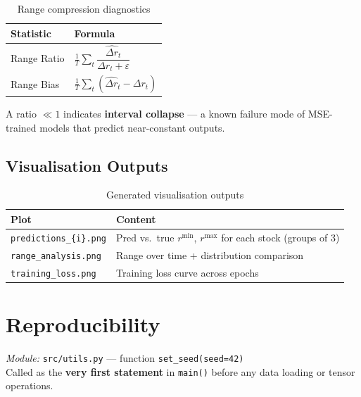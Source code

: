 \documentclass[12pt,a4paper]{article}
\newcommand{\codeinline}[1]{\texttt{\small #1}}
\begin{document}
\begin{table}[H]
\centering
\begin{tabular}{L{3cm} L{7cm}}
\toprule
\textbf{Statistic} & \textbf{Formula} \\
\midrule
Range Ratio & $\frac{1}{T}\sum_t \dfrac{\widehat{\Delta r}_t}{\Delta r_t + \varepsilon}$ \\[0.8em]
Range Bias  & $\frac{1}{T}\sum_t (\widehat{\Delta r}_t - \Delta r_t)$ \\
\bottomrule
\end{tabular}
\caption{Range compression diagnostics}
\end{table}

A ratio $\ll 1$ indicates \textbf{interval collapse} — a known failure mode of MSE-trained models that predict near-constant outputs.

\subsection{Visualisation Outputs}

\begin{table}[H]
\centering
\begin{tabular}{L{4.5cm} L{8.5cm}}
\toprule
\textbf{Plot} & \textbf{Content} \\
\midrule
\codeinline{predictions\_\{i\}.png} & Pred vs.\ true $r^{\min}$, $r^{\max}$ for each stock (groups of 3) \\
\codeinline{range\_analysis.png}    & Range over time + distribution comparison \\
\codeinline{training\_loss.png}     & Training loss curve across epochs \\
\bottomrule
\end{tabular}
\caption{Generated visualisation outputs}
\end{table}

\section{Reproducibility}

\textit{Module:} \codeinline{src/utils.py} — function \codeinline{set\_seed(seed=42)}\\
Called as the \textbf{very first statement} in \codeinline{main()} before any data loading or tensor operations.
\end{document}
